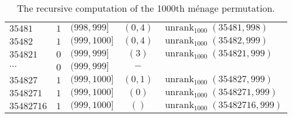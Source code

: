 \begin{table}
\begin{tabular}{|l|r|l|c|l|}
    $35481   $ & $1$   & $(998,999]$        & $(0,4)$   & $\operatorname{unrank}_{1000}(35481,998)$    \\
    $35482   $ & $1$   & $(999,1000]$       & $(0,4)$   & $\operatorname{unrank}_{1000}(35482,999)$    \\ \hline
    $354821  $ & $0$   & $(999,999]$        & $(3)$     & $\operatorname{unrank}_{1000}(354821,999)$   \\
    $\cdots$   & $0$   & $(999,999]$        & $-$       & \\
    $354827  $ & $1$   & $(999,1000]$       & $(0,1)$   & $\operatorname{unrank}_{1000}(354827,999)$   \\ \hline
    $3548271 $ & $1$   & $(999,1000]$       & $(0)$     & $\operatorname{unrank}_{1000}(3548271,999)$  \\ \hline
    $35482716$ & $1$   & $(999,1000]$       & $()$      & $\operatorname{unrank}_{1000}(35482716,999)$ \\ \hline
  \end{tabular}
  \caption[Steps for computing the $1000$th m\'enage permutation in $S_8$.]{
    The recursive computation of the 1000th m\'enage permutation.
  }
\label{table:unrankMenage}
\end{table}
